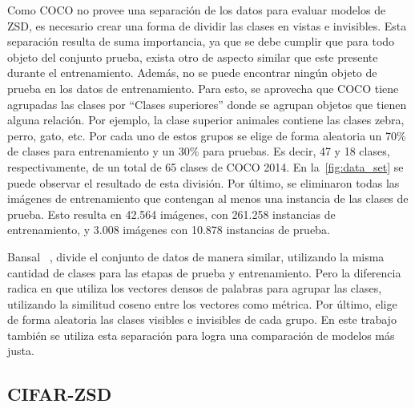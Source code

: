Como COCO no provee una separación de los datos para evaluar modelos de ZSD, es necesario crear una forma de dividir las clases en vistas e invisibles. Esta separación resulta de suma importancia, ya que se debe cumplir que para todo objeto del conjunto prueba, exista otro de aspecto similar que este presente durante el entrenamiento. Además, no se puede encontrar ningún objeto de prueba en los datos de entrenamiento. Para esto, se aprovecha que COCO tiene agrupadas las clases por ``Clases superiores'' donde se agrupan objetos que tienen alguna relación. Por ejemplo, la clase superior animales contiene las clases zebra, perro, gato, etc. Por cada uno de estos grupos se elige de forma aleatoria un 70\% de clases para entrenamiento y un 30\% para pruebas. Es decir, 47 y 18 clases, respectivamente, de un total de 65 clases de COCO 2014. En la~\autoref{fig:data_set} se puede observar el resultado de esta división. Por último, se eliminaron todas las imágenes de entrenamiento que contengan al menos una instancia de las clases de prueba. Esto resulta en 42.564 imágenes, con 261.258 instancias de entrenamiento, y 3.008 imágenes con 10.878 instancias de prueba. 

Bansal \etal~\cite{bansal2018zero}, divide el conjunto de datos de manera similar, utilizando la misma cantidad de clases para las etapas de prueba y entrenamiento. Pero la diferencia radica en que utiliza los vectores densos de palabras para agrupar las clases, utilizando la  similitud coseno entre los vectores como métrica. Por último, elige de forma aleatoria las clases visibles e invisibles de cada grupo. En este trabajo también se utiliza esta separación para logra una comparación de modelos más justa.


\subsection{CIFAR-ZSD} \label{ssec:cifarzsd}

